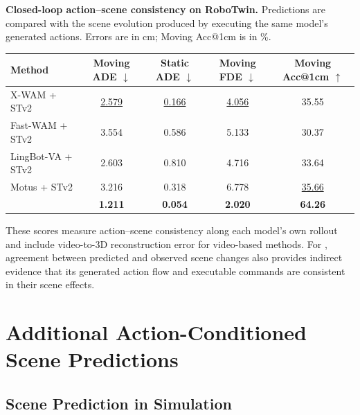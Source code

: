 \begin{center}
\begin{minipage}{\linewidth}
\makeatletter{}\makeatother
    \centering
    \small
    \setlength{\tabcolsep}{4pt}
    \renewcommand{\arraystretch}{1.10}
    \caption{\textbf{Closed-loop action--scene consistency on RoboTwin.}
    Predictions are compared with the scene evolution produced by executing
    the same model's generated actions. Errors are in cm; Moving Acc@1cm
    is in \%.}
    \label{tab:app:joint_consistency}
    \begin{adjustbox}{max width=\linewidth}
    \begin{tabular}{@{}lcccc@{}}
        \toprule
        Method & Moving ADE $\downarrow$ & Static ADE $\downarrow$
        & Moving FDE $\downarrow$ & Moving Acc@1cm $\uparrow$ \\
        \midrule
        X-WAM + STv2 & \underline{2.579} & \underline{0.166} & \underline{4.056} & 35.55 \\
        Fast-WAM + STv2 & 3.554 & 0.586 & 5.133 & 30.37 \\
        LingBot-VA + STv2 & 2.603 & 0.810 & 4.716 & 33.64 \\
        Motus + STv2 & 3.216 & 0.318 & 6.778 & \underline{35.66} \\
        \method{} & \textbf{1.211} & \textbf{0.054} & \textbf{2.020} & \textbf{64.26} \\
        \bottomrule
    \end{tabular}
    \end{adjustbox}
\end{minipage}
\end{center}

These scores measure action--scene consistency along each model's own
rollout and include video-to-3D reconstruction error for video-based methods.
For \method{}, agreement between predicted and observed scene changes also
provides indirect evidence that its generated action flow and executable
commands are consistent in their scene effects.

\section{Additional Action-Conditioned Scene Predictions}
\label{app:scene_flow_visualizations}

\subsection{Scene Prediction in Simulation}
\label{app:sim_scene_flow}

